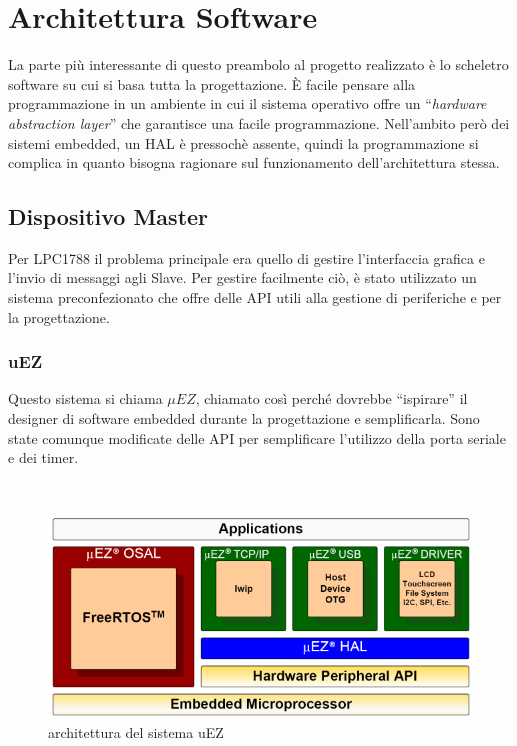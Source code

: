 \documentclass[a4paper,titlepage]{book}
\begin{document}


\chapter{Architettura Software}

La parte più interessante di questo preambolo al progetto realizzato è lo scheletro software su cui si basa tutta la progettazione. È facile pensare alla programmazione in un ambiente in cui il sistema operativo offre un ``\textit{hardware abstraction layer}'' che garantisce una facile programmazione. Nell'ambito però dei sistemi embedded, un HAL è pressochè assente, quindi la programmazione si complica in quanto bisogna ragionare sul funzionamento dell'architettura stessa.


\section{Dispositivo Master}

Per LPC1788 il problema principale era quello di gestire l'interfaccia grafica e l'invio di messaggi agli Slave. Per gestire facilmente ciò, è stato utilizzato un sistema preconfezionato che offre delle API utili alla gestione di periferiche e per la progettazione. 


\subsection{uEZ}
Questo sistema si chiama $\mu EZ$, chiamato così perché dovrebbe ``ispirare'' il designer di software embedded durante la progettazione e semplificarla. Sono state comunque modificate delle API per semplificare l'utilizzo della porta seriale e dei timer.

~

\begin{figure}[!h]
\centering
\includegraphics[scale=0.7]{uEZ.png}
\caption{architettura del sistema uEZ}
\end{figure}
\end{document}
